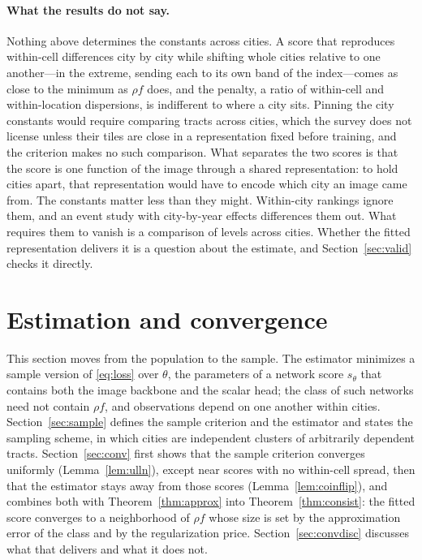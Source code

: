 \documentclass[11pt]{article}
\theoremstyle{remark}
\begin{document}
\paragraph{What the results do not say.} Nothing above determines the constants across cities. A score
that reproduces within-cell differences city by city while shifting whole cities relative to one
another---in the extreme, sending each to its own band of the index---comes as close to the minimum as
$\rho f$ does, and the penalty, a ratio of within-cell and within-location dispersions, is indifferent
to where a city sits. Pinning the city constants would require comparing tracts across cities, which the
survey does not license unless their tiles are close in a representation fixed before training, and the
criterion makes no such comparison. What separates the two scores is that the score is one function of
the image through a shared representation: to hold cities apart, that representation would have to
encode which city an image came from. The constants matter less than they might. Within-city rankings
ignore them, and an event study with city-by-year effects differences them out. What requires them to vanish is a comparison of levels across cities.
Whether the fitted representation delivers it is a question about the estimate, and
Section~\ref{sec:valid} checks it directly.

\section{Estimation and convergence}\label{sec:scale}

This section moves from the population to the sample. The estimator minimizes a sample version of
\eqref{eq:loss} over $\theta$, the parameters of a network score $s_\theta$ that contains both the image
backbone and the scalar head; the class of such networks need not contain $\rho f$, and observations
depend on one another within cities. Section~\ref{sec:sample} defines the sample criterion and the
estimator and states the sampling scheme, in which cities are independent clusters of arbitrarily
dependent tracts. Section~\ref{sec:conv} first shows that the sample criterion converges uniformly
(Lemma~\ref{lem:ulln}), except near scores with no within-cell spread, then that the estimator stays
away from those scores (Lemma~\ref{lem:coinflip}), and combines both with Theorem~\ref{thm:approx} into
Theorem~\ref{thm:consist}: the fitted score converges to a neighborhood of $\rho f$ whose size is set
by the approximation error of the class and by the regularization price.
Section~\ref{sec:convdisc} discusses what that delivers and what it does not.
\end{document}
